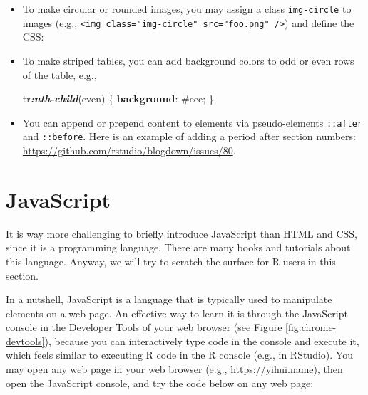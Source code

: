 \documentclass[12pt,]{krantz}
\makeatletter
\newenvironment{Shaded}{\begin{snugshade}}{\end{snugshade}}
\newcommand{\DecValTok}[1]{\textcolor[rgb]{0.00,0.00,0.81}{#1}}
\newcommand{\FunctionTok}[1]{\textcolor[rgb]{0.00,0.00,0.00}{#1}}
\newcommand{\InformationTok}[1]{\textcolor[rgb]{0.56,0.35,0.01}{\textbf{\textit{#1}}}}
\newcommand{\KeywordTok}[1]{\textcolor[rgb]{0.13,0.29,0.53}{\textbf{#1}}}
\newcommand{\NormalTok}[1]{#1}
\newenvironment{kframe}{%
\medskip{}
\setlength{\fboxsep}{.8em}
 \def\at@end@of@kframe{}%
 \ifinner\ifhmode%
  \def\at@end@of@kframe{\end{minipage}}%
  \begin{minipage}{\columnwidth}%
 \fi\fi%
 \def\FrameCommand##1{\hskip\@totalleftmargin \hskip-\fboxsep
 \colorbox{shadecolor}{##1}\hskip-\fboxsep
     \hskip-\linewidth \hskip-\@totalleftmargin \hskip\columnwidth}%
 \MakeFramed {\advance\hsize-\width
   \@totalleftmargin\z@ \linewidth\hsize
   \@setminipage}}%
 {\par\unskip\endMakeFramed%
 \at@end@of@kframe}
\renewenvironment{Shaded}{\begin{kframe}}{\end{kframe}}
\theoremstyle{definition}
\theoremstyle{definition}
\theoremstyle{definition}
\theoremstyle{remark}
\makeatother
\begin{document}
\begin{itemize}
\item
  To make circular or rounded images, you may assign a class
  \texttt{img-circle} to images (e.g.,
  \texttt{\textless{}img\ class="img-circle"\ src="foo.png"\ /\textgreater{}})
  and define the CSS:

\begin{Shaded}
\end{Shaded}
\item
  To make striped tables, you can add background colors to odd or even
  rows of the table, e.g.,

\begin{Shaded}
\begin{Highlighting}[]
\NormalTok{tr}\InformationTok{:nth-child}\NormalTok{(even) \{}
  \KeywordTok{background}\NormalTok{: }\DecValTok{#eee}\NormalTok{;}
\NormalTok{\}}
\end{Highlighting}
\end{Shaded}
\item
  You can append or prepend content to elements via pseudo-elements
  \texttt{::after} and \texttt{::before}. Here is an example of adding a
  period after section numbers:
  \url{https://github.com/rstudio/blogdown/issues/80}.
\end{itemize}

\hypertarget{javascript}{%
\section{JavaScript}\label{javascript}}

It is way more challenging to briefly introduce
JavaScript than HTML and CSS, since it is a
programming language. There are many books and tutorials about this
language. Anyway, we will try to scratch the surface for R users in this
section.

In a nutshell, JavaScript is a language that is typically used to
manipulate elements on a web page. An effective way to learn it is
through the JavaScript console in the Developer Tools of your web
browser (see Figure \ref{fig:chrome-devtools}), because you can
interactively type code in the console and execute it, which feels
similar to executing R code in the R console (e.g., in RStudio). You may
open any web page in your web browser (e.g., \url{https://yihui.name}),
then open the JavaScript console, and try the code below on any web
page:
\end{document}
